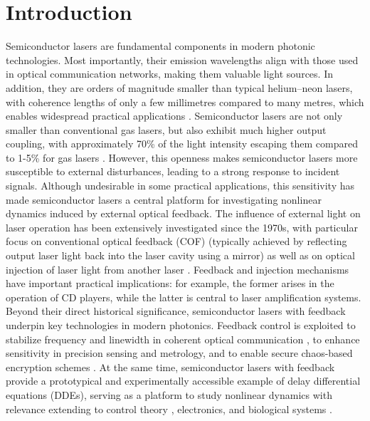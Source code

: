 \section{Introduction}
\label{sec:introduction}
%
Semiconductor lasers are fundamental components in modern photonic technologies.
Most importantly, their emission wavelengths align with those used in optical communication networks, making them valuable light sources.
In addition, they are orders of magnitude smaller than typical helium–neon lasers, with coherence lengths of only a few millimetres compared to many metres, which enables widespread practical applications \cite{heiskanen2018photobiomodulation}.
Semiconductor lasers are not only smaller than conventional gas lasers, but also exhibit much higher output coupling, with approximately 70\% of the light intensity escaping them compared to 1-5\% for gas lasers \cite{vantartwijk1995semiconductor}.
However, this openness makes semiconductor lasers more susceptible to external disturbances, leading to a strong response to incident signals.
Although undesirable in some practical applications, this sensitivity has made semiconductor lasers a central platform for investigating nonlinear dynamics induced by external optical feedback.
The influence of external light on laser operation has been extensively investigated since the 1970s, with particular focus on conventional optical feedback (COF) (typically achieved by reflecting output laser light back into the laser cavity using a mirror) as well as on optical injection of laser light from another laser \cite{weiss1991dynamics}.
Feedback and injection mechanisms have important practical implications: for example, the former arises in the operation of CD players, while the latter is central to laser amplification systems.
Beyond their direct historical significance, semiconductor lasers with feedback underpin key technologies in modern photonics.
Feedback control is exploited to stabilize frequency and linewidth in coherent optical communication \cite{tkach2003regimes}, to enhance sensitivity in precision sensing and metrology, and to enable secure chaos-based encryption schemes \cite{uchida2008fast}.
At the same time, semiconductor lasers with feedback provide a prototypical and experimentally accessible example of delay differential equations (DDEs), serving as a platform to study nonlinear dynamics with relevance extending to control theory \cite{stepan1989retarded}, electronics, and biological systems \cite{mackey1977oscillation}.
%
%
